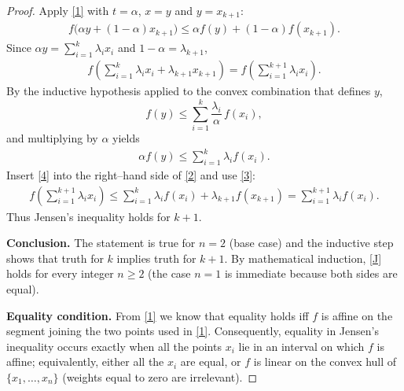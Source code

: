 \begin{proof}
Apply \eqref{1} with $t=\alpha$, $x=y$ and $y=x_{k+1}$:
\begin{align}
f\bigl(\alpha y+(1-\alpha)x_{k+1}\bigr)
   \le \alpha f(y)+(1-\alpha)f(x_{k+1}).
\tag{2}
\end{align}
Since $\alpha y=\sum_{i=1}^{k}\lambda_i x_i$ and $1-\alpha=\lambda_{k+1}$,
\begin{align}
f\!\left(\sum_{i=1}^{k}\lambda_i x_i+\lambda_{k+1}x_{k+1}\right)
   =f\!\left(\sum_{i=1}^{k+1}\lambda_i x_i\right).
\tag{3}
\end{align}
By the inductive hypothesis applied to the convex combination that defines $y$,
\[
f(y)\le \sum_{i=1}^{k}\frac{\lambda_i}{\alpha}\,f(x_i),
\]
and multiplying by $\alpha$ yields
\begin{align}
\alpha f(y)\le \sum_{i=1}^{k}\lambda_i f(x_i).
\tag{4}
\end{align}
Insert \eqref{4} into the right–hand side of \eqref{2} and use \eqref{3}:
\begin{align*}
f\!\left(\sum_{i=1}^{k+1}\lambda_i x_i\right)
   \le \sum_{i=1}^{k}\lambda_i f(x_i)+\lambda_{k+1}f(x_{k+1})
   =\sum_{i=1}^{k+1}\lambda_i f(x_i).
\end{align*}
Thus Jensen’s inequality holds for $k+1$.

\medskip
\noindent\textbf{Conclusion.}  
The statement is true for $n=2$ (base case) and the inductive step shows that truth for $k$ implies truth for $k+1$. By mathematical induction, \eqref{J} holds for every integer $n\ge2$ (the case $n=1$ is immediate because both sides are equal).

\medskip
\noindent\textbf{Equality condition.}  
From \eqref{1} we know that equality holds iff $f$ is affine on the segment joining the two points used in \eqref{1}. Consequently, equality in Jensen’s inequality occurs exactly when all the points $x_i$ lie in an interval on which $f$ is affine; equivalently, either all the $x_i$ are equal, or $f$ is linear on the convex hull of $\{x_1,\dots ,x_n\}$ (weights equal to zero are irrelevant).

\end{proof}
